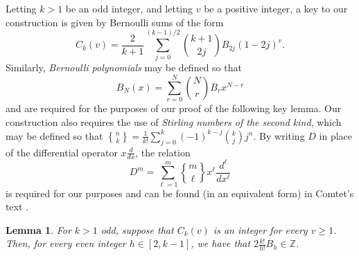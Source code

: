 \documentclass[12pt]{article}
\newtheorem{lemma}{Lemma}%
\DeclareRobustCommand{\stirling}{\genfrac\{\}{0pt}{}}
\begin{document}
 Letting $k > 1$ be an odd integer, and letting $v$ be a positive integer, a key to our construction is given by Bernoulli sums of the form 
\begin{equation}\label{defineCku} 
 C_{k}(v) = \frac{2}{k+1} \sum_{j=0}^{(k-1)/2} \binom{k+1}{2j} B_{2j} (1 - 2 j)^{v}. 
\end{equation}
 Similarly, \emph{Bernoulli polynomials} may be defined so that 
\begin{equation}\label{defineBNx} 
 B_{N}(x) = \sum_{r=0}^{N} \binom{N}{r} B_{r} x^{N-r}
\end{equation}
 and are required for the purposes of our proof of the following key lemma. Our construction also requires the use of \emph{Stirling 
 numbers of the second kind}, which may be defined so that $\stirling{n}{k} = \frac{1}{k!} \sum_{j=0}^{k} (-1)^{k-j} \binom{k}{j} j^n$. 
 By writing $D$ in place of the differential operator $x \frac{d}{dx}$, the relation 
\begin{equation}\label{DStirling} 
 D^{m} = \sum_{\ell = 1}^{m} \stirling{m}{\ell} x^{\ell} \frac{d^{\ell}}{dx^{\ell}} 
\end{equation}
 is required for our purposes and can be found  (in an equivalent form) 
  in Comtet's text \cite[p.\ 220]{Comtet1974}. 

\begin{lemma}\label{triangularlemma}
 For $k > 1$ odd, suppose that $C_k(v)$ is an integer for every $v \geq 1$. Then, for every even integer $h \in [2, k-1]$, 
 we have that 
 $ 2 \frac{k!}{h!} B_{h} \in \mathbb{Z}$. 
\end{lemma}
\end{document}
